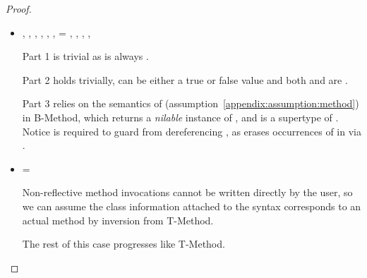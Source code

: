 \begin{lemma}
\begin{proof}
\begin{case}[B-Method]
\begin{itemize}
  \item[]
\begin{subcase}[T-Method]
  \judgementtworewrite {\propenv{}} {\ep{}} {\s{}} {\e{}},
             \issubtypein{}{\s{}}{\Object{}},
  ,
                  ,
                  ,
             ,
  \e{} = { 
                          {} 
                          {}
                          {\mth{}} {} {}},
                        ,
  \inpropenv{\topprop{}}{\thenprop{\prop{}}},
  \inpropenv{\topprop{}}{\elseprop{\prop{}}},
  \issubobjin{}{\emptyobject{}}{\object{}}


Part 1 is trivial as \object{} is always \emptyobject{}.

Part 2 holds trivially, \val{} can be either a true or false value
and both {\thenprop{\prop{}}} and {\elseprop{\prop{}}}
are \topprop{}.

Part 3 relies on the semantics of \invokejavamethodliteral (assumption~\ref{appendix:assumption:method})
in B-Method, which returns a \emph{nilable} instance of ,
and \ty{} is a supertype of .
Notice \issubtypein{}{\s{}}{\Object{}} is required to guard from dereferencing \nil{},
as {} erases occurrences of \Nil{} in \s{} via  .
\end{subcase}
\item[]
\begin{subcase}[T-MethodStatic]
  \ep{} = 
  { 
        {} 
        {}
        {\mth{}} {} {}}

  Non-reflective method invocations cannot be written directly by the user, so we can assume
  the class information attached to the syntax corresponds to an actual method by inversion
  from T-Method.

  The rest of this case progresses like T-Method.
\end{subcase}


\end{itemize}


\end{case}
\end{proof}
\end{lemma}
